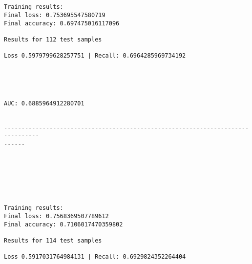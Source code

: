 \documentclass[11pt]{article}
\begin{document}
    \begin{center}
    \end{center}
    { \hspace*{\fill} \\}
    
    \begin{Verbatim}[commandchars=\\\{\}]

Training results:
Final loss: 0.753695547580719
Final accuracy: 0.697475016117096

Results for 112 test samples

Loss 0.5979799628257751 | Recall: 0.6964285969734192



    \end{Verbatim}

    \begin{center}
    \end{center}
    { \hspace*{\fill} \\}
    
    \begin{Verbatim}[commandchars=\\\{\}]
AUC: 0.6885964912280701


--------------------------------------------------------------------------------
------


    \end{Verbatim}

    \begin{center}
    \end{center}
    { \hspace*{\fill} \\}
    
    \begin{center}
    \end{center}
    { \hspace*{\fill} \\}
    
    \begin{Verbatim}[commandchars=\\\{\}]

Training results:
Final loss: 0.7568369507789612
Final accuracy: 0.7106017470359802

Results for 114 test samples

Loss 0.5917031764984131 | Recall: 0.6929824352264404



    \end{Verbatim}
\end{document}
